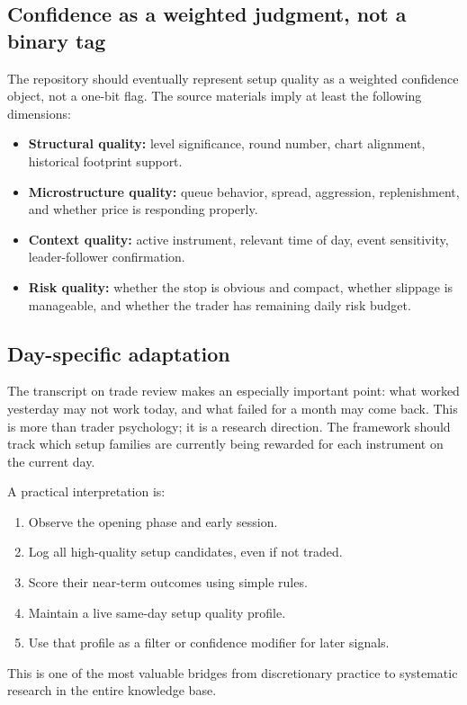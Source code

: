 \subsection{Confidence as a weighted judgment, not a binary tag}

The repository should eventually represent setup quality as a weighted confidence object, not a one-bit flag. The source materials imply at least the following dimensions:

\begin{itemize}[leftmargin=1.5em]
\item \textbf{Structural quality:} level significance, round number, chart alignment, historical footprint support.
\item \textbf{Microstructure quality:} queue behavior, spread, aggression, replenishment, and whether price is responding properly.
\item \textbf{Context quality:} active instrument, relevant time of day, event sensitivity, leader-follower confirmation.
\item \textbf{Risk quality:} whether the stop is obvious and compact, whether slippage is manageable, and whether the trader has remaining daily risk budget.
\end{itemize}

\subsection{Day-specific adaptation}

The transcript on trade review makes an especially important point: what worked yesterday may not work today, and what failed for a month may come back. This is more than trader psychology; it is a research direction. The framework should track which setup families are currently being rewarded for each instrument on the current day.

A practical interpretation is:

\begin{enumerate}[leftmargin=1.5em]
\item Observe the opening phase and early session.
\item Log all high-quality setup candidates, even if not traded.
\item Score their near-term outcomes using simple rules.
\item Maintain a live same-day setup quality profile.
\item Use that profile as a filter or confidence modifier for later signals.
\end{enumerate}

This is one of the most valuable bridges from discretionary practice to systematic research in the entire knowledge base.
